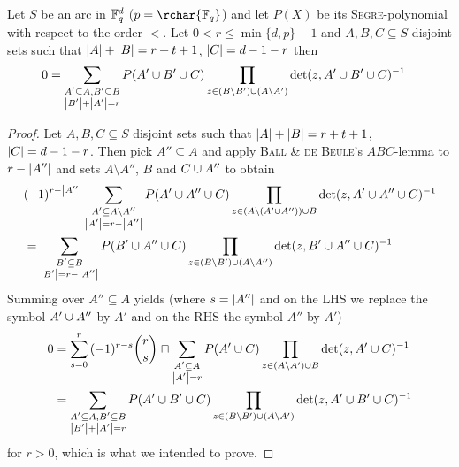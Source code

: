 \documentclass[a4paper]{article}
\begin{document}
\begin{lemma} 
  Let $S$ be an arc in $\mathbb{F}_{q}^d$ ($p=\rchar{\field{q}}$) and let
  $P(X)$ be its \textsc{Segre}-polynomial with respect to the order
  $<$. Let $0<r\leq\min\{d,p\}-1$ and $A,B,C\subseteq S$ disjoint sets
  such that $\left|A\right|+\left|B\right|=r+t+1$, $\left|C\right|=d-1-r$ then
  \begin{align}
    0 &= \sum_{\substack{A'\subseteq A, B'\subseteq B\\
        \left|B'\right|+\left|A'\right|=r}}{P(A'\cup B'\cup C)\prod_{z\in
        (B\setminus B')\cup (A\setminus A')}{\det(z,A'\cup B'\cup C)^{-1}}}
  \end{align}
\end{lemma}

\begin{proof}
  Let $A,B,C\subseteq S$ disjoint sets such
  that $\left|A\right|+\left|B\right|=r+t+1$, $\left|C\right|=d-1-r$. Then pick $A''\subseteq
  A$ and apply \textsc{Ball \& de Beule}'s $ABC$-lemma to
  $r-\left|A''\right|$ and sets $A\setminus A''$, $B$ and $C\cup A''$ to
  obtain
  \begin{align}
    &(-1)^{r-\left|A''\right|}\sum_{\substack{A'\subseteq A\setminus A''\\
        \left|A'\right|=r-\left|A''\right|}}{P(A'\cup A''\cup C)\prod_{z\in
        (A\setminus (A'\cup A''))\cup B}{\det(z,A'\cup A''\cup C)^{-1}}}\\
    &= \sum_{\substack{B'\subseteq B\\
        \left|B'\right|=r-\left|A''\right|}}{P(B'\cup A''\cup C)\prod_{z\in
        (B\setminus B')\cup (A\setminus A'')}{\det(z,B'\cup A''\cup C)^{-1}}}\text{.}
  \end{align} 
  Summing over $A''\subseteq A$ yields (where $s=\left|A''\right|$ and on the
  LHS we replace the symbol $A'\cup A''$ by $A'$ and on the RHS the
  symbol $A''$ by $A'$)
  \begin{align}
    0 &= \sum_{s=0}^r{(-1)^{r-s}\binom{r}{s}}\times\sum_{\substack{A'\subseteq A\\ \card{A'}=r}}{P(A'\setjoin C)\prod_{z\in
        (A\setminus A')\setjoin B}{\det(z,A'\setjoin C)^{-1}}}\\
    &= \sum_{\substack{A'\subseteq A, B'\subseteq B\\
        \card{B'}+\card{A'}=r}}{P(A'\setjoin B'\setjoin C)\prod_{z\in
        (B\setminus B')\setjoin (A\setminus A')}{\det(z,A'\setjoin B'\setjoin C)^{-1}}}
  \end{align}
  for $r>0$, which is what we intended to prove.
\end{proof}
\end{document}
